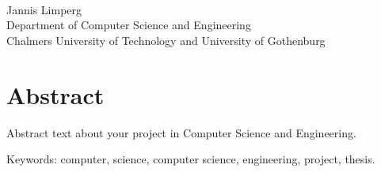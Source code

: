 
\begingroup
\setlength{\parindent}{0pt}

\oneLineTitle\\
Jannis Limperg\\
Department of Computer Science and Engineering\\
Chalmers University of Technology and University of Gothenburg\setlength{\parskip}{0.5cm}

\endgroup

\thispagestyle{plain}			%
\setlength{\parskip}{0pt plus 1.0pt}
\section*{Abstract}
Abstract text about your project in  Computer Science and Engineering.

\vfill
Keywords: computer, science, computer science, engineering, project, thesis.

\newpage				%
\thispagestyle{empty}
\mbox{}